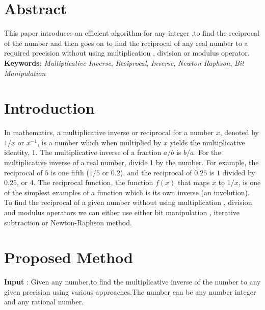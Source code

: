 \documentclass[twocolumn]{article}      %
\begin{document}
\maketitle                   %



\section{Abstract} 
This paper introduces an efficient algorithm for any integer ,to find the reciprocal of the number and then goes on to find the reciprocal of any real number to a required precision without using multiplication , division or modulus operator.\\
\textbf{Keywords}: \textit{Multiplicative Inverse}, \textit{Reciprocal}, \textit{Inverse}, \textit{Newton Raphson}, \textit{Bit Manipulation}
\section{Introduction}
In mathematics, a multiplicative inverse or reciprocal for a number $x$, denoted by $1/x$ or ${x^{-1}}$, is a number which when multiplied by $x$ yields the multiplicative identity, $1$. The multiplicative inverse of a fraction $a/b$ is $b/a$. For the multiplicative inverse of a real number, divide 1 by the number. For example, the reciprocal of $5$ is one fifth ($1/5$ or $0.2$), and the reciprocal of $0.25$ is $1$ divided by $0.25$, or $4$. The reciprocal function, the function $f(x)$ that maps $x$ to $1/x$, is one of the simplest examples of a function which is its own inverse (an involution).\\
To find the reciprocal of a given number without using multiplication , division and modulus operators we can either use either bit manipulation , iterative subtraction or Newton-Raphson method.
\section{Proposed Method}
\textbf{Input} : Given any number,to find the multiplicative inverse of the number to any given precision using various approaches.The number can be any number integer and any rational number.
\end{document}
